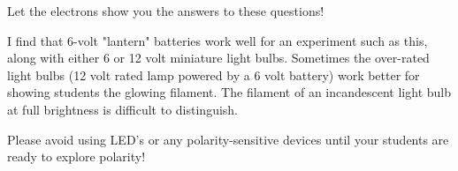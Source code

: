 





Let the electrons show you the answers to these questions!







I find that 6-volt "lantern" batteries work well for an experiment such as this, along with either 6 or 12 volt miniature light bulbs.  Sometimes the over-rated light bulbs (12 volt rated lamp powered by a 6 volt battery) work better for showing students the glowing filament.  The filament of an incandescent light bulb at full brightness is difficult to distinguish.

Please avoid using LED's or any polarity-sensitive devices until your students are ready to explore polarity!




